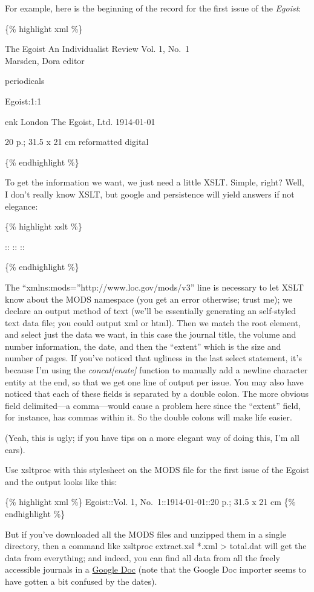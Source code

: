 \documentclass[
  12pt,
]{article}
\begin{document}
For example, here is the beginning of the record for the first issue of
the \emph{Egoist}:

\{\% highlight xml \%\}

The Egoist An Individualist Review Vol. 1, No.~1\\

Marsden, Dora editor

periodicals

Egoist:1:1

enk London The Egoist, Ltd. 1914-01-01

20 p.; 31.5 x 21 cm reformatted digital

\{\% endhighlight \%\}

To get the information we want, we just need a little XSLT. Simple,
right? Well, I don't really know XSLT, but google and persistence will
yield answers if not elegance:

\{\% highlight xslt \%\}

:: :: ::

\{\% endhighlight \%\}

The ``xmlns:mods=''http://www.loc.gov/mods/v3'' line is necessary to let
XSLT know about the MODS namespace (you get an error otherwise; trust
me); we declare an output method of text (we'll be essentially
generating an self-styled text data file; you could output xml or html).
Then we match the root element, and select just the data we want, in
this case the journal title, the volume and number information, the
date, and then the ``extent'' which is the size and number of pages. If
you've noticed that ugliness in the last select statement, it's because
I'm using the \emph{concat{[}enate{]}} function to manually add a
newline character entity at the end, so that we get one line of output
per issue. You may also have noticed that each of these fields is
separated by a double colon. The more obvious field delimited---a
comma---would cause a problem here since the ``extent'' field, for
instance, has commas within it. So the double colons will make life
easier.

(Yeah, this is ugly; if you have tips on a more elegant way of doing
this, I'm all ears).

Use xsltproc with this stylesheet on the MODS file for the first issue
of the Egoist and the output looks like this:

\{\% highlight xml \%\} Egoist::Vol. 1, No.~1::1914-01-01::20 p.; 31.5 x
21 cm \{\% endhighlight \%\}

But if you've downloaded all the MODS files and unzipped them in a
single directory, then a command like xsltproc extract.xsl *.xml
\textgreater{} total.dat will get the data from everything; and indeed,
you can find all data from all the freely accessible journals in a
\href{https://docs.google.com/spreadsheet/ccc?key=0Aqxybvy6W0jedE5QczhNYTdVVXFua2k3cnZtcmh2SUE}{Google
Doc} (note that the Google Doc importer seems to have gotten a bit
confused by the dates).
\end{document}
